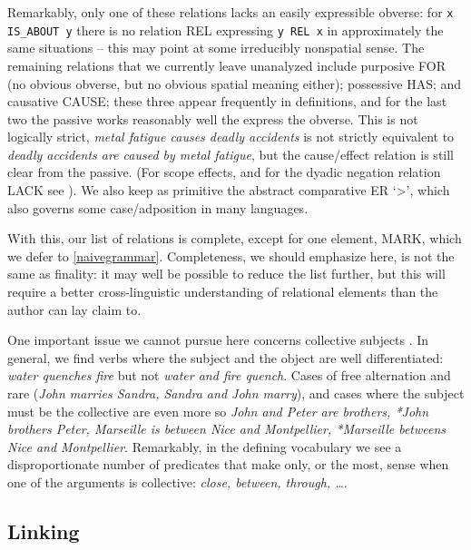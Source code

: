 \documentclass[11pt,bookmarks,bookmarksnumbered,naturalnames,plainpages=false,pdftex,colorlinks=true,urlcolor=blue,bookmarksdepth=subsection,plainpages=false]{paper}
\begin{document}
Remarkably, only one of these relations lacks an easily expressible obverse:
for {\tt x IS\_ABOUT y} there is no relation REL expressing {\tt y REL x} in
approximately the same situations -- this may point at some irreducibly
nonspatial sense. The remaining relations that we currently leave unanalyzed
include purposive FOR (no obvious obverse, but no obvious spatial meaning
either); possessive HAS; and causative CAUSE; these three appear frequently in
definitions, and for the last two the passive works reasonably well the
express the obverse. This is not logically strict, {\it metal fatigue causes
  deadly accidents} is not strictly equivalent to {\it deadly accidents are
  caused by metal fatigue}, but the cause/effect relation is still clear from
the passive. (For scope effects, and for the dyadic negation relation LACK see
\cite{Kornai:2020a}). We also keep as primitive the abstract comparative ER
`>', which also governs some case/adposition in many languages.

With this, our list of relations is complete, except for one element, MARK,
which we defer to \ref{naivegrammar}. Completeness, we should emphasize here,
is not the same as finality: it may well be possible to reduce the list
further, but this will require a better cross-linguistic understanding of
relational elements than the author can lay claim to. 

One important issue we cannot pursue here concerns collective subjects
\citep{Scha:1981}. In general, we find verbs where the subject and the object
are well differentiated: {\it water quenches fire} but not {\it *water and
  fire quench}. Cases of free alternation and rare ({\it John marries Sandra,
  Sandra and John marry}), and cases where the subject must be the collective
are even more so {\it John and Peter are brothers, *John brothers Peter,
  Marseille is between Nice and Montpellier, *Marseille betweens Nice and
  Montpellier}. Remarkably, in the defining vocabulary we see a
disproportionate number of predicates that make only, or the most, sense when
one of the arguments is collective: {\it close, between, through, \ldots}. 






\subsection{Linking}\label{linking}
\end{document}
